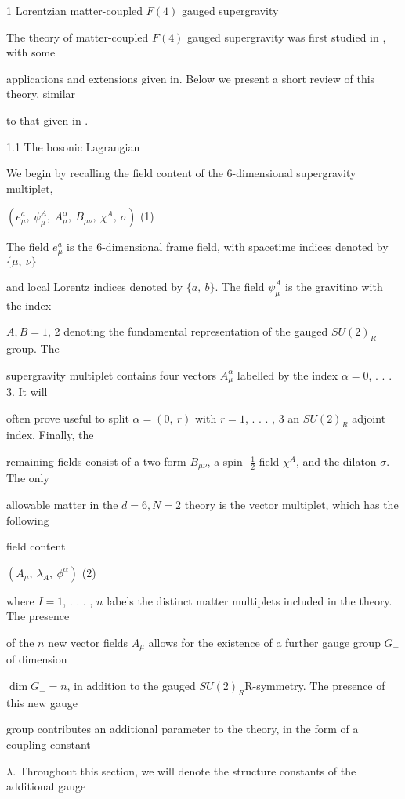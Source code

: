 \documentclass[a4paper,12pt]{article}
\begin{document}
1 Lorentzian matter-coupled $F(4)$ gauged supergravity

The theory of matter-coupled $F(4)$ gauged supergravity was first studied in , with some

applications and extensions given in. Below we present a short review of this theory, similar

to that given in .

1.1 The bosonic Lagrangian

We begin by recalling the field content of the 6-dimensional supergravity multiplet,
\begin{center}
$(e_{\mu}^{a},\ \psi_{\mu}^{A},\ A_{\mu}^{\alpha},\ B_{\mu\nu},\ \chi^{A},\ \sigma)$   (1)
\end{center}
The field $e_{\mu}^{a}$ is the 6-dimensional frame field, with spacetime indices denoted by $\{\mu,\ \nu\}$

and local Lorentz indices denoted by $\{a,\ b\}$. The field $\psi_{\mu}^{A}$ is the gravitino with the index

$A, B = 1$, 2 denoting the fundamental representation of the gauged $SU(2)_{R}$ group. The

supergravity multiplet contains four vectors $A_{\mu}^{\alpha}$ labelled by the index $\alpha = 0$, . . . 3. It will

often prove useful to split $\alpha=(0,\ r)$ with $r=1$, . . . , 3 an $SU(2)_{R}$ adjoint index. Finally, the

remaining fields consist of a two-form $B_{\mu\nu}$, a spin- $\displaystyle \frac{1}{2}$ field $\chi^{A}$, and the dilaton $\sigma$. The only

allowable matter in the $d=6, N=2$ theory is the vector multiplet, which has the following

field content
\begin{center}
$(A_{\mu},\ \lambda_{A},\ \phi^{\alpha})$   (2)
\end{center}
where $I=1$, . . . , $n$ labels the distinct matter multiplets included in the theory. The presence

of the $n$ new vector fields $A_{\mu}$ allows for the existence of a further gauge group $G_{+}$ of dimension

$\dim G_{+}=n$, in addition to the gauged $SU(2)_{R} \mathrm{R}$-symmetry. The presence of this new gauge

group contributes an additional parameter to the theory, in the form of a coupling constant

$\lambda$. Throughout this section, we will denote the structure constants of the additional gauge
\end{document}

